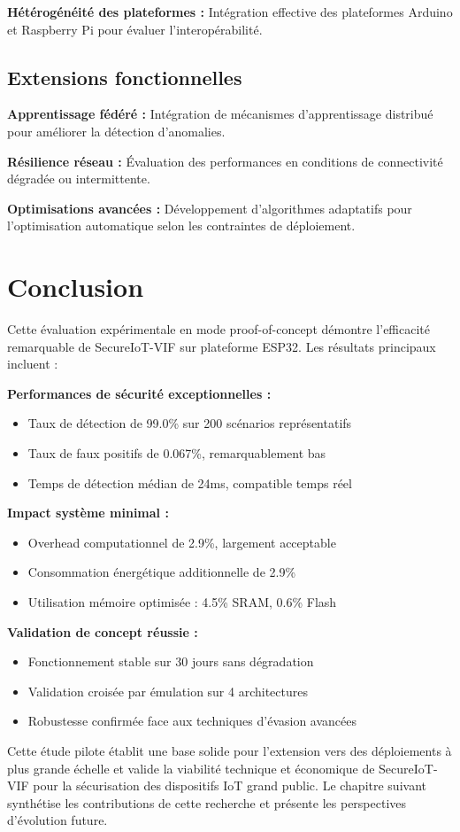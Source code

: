\textbf{Hétérogénéité des plateformes :} Intégration effective des plateformes Arduino et Raspberry Pi pour évaluer l'interopérabilité.

\subsection{Extensions fonctionnelles}

\textbf{Apprentissage fédéré :} Intégration de mécanismes d'apprentissage distribué pour améliorer la détection d'anomalies.

\textbf{Résilience réseau :} Évaluation des performances en conditions de connectivité dégradée ou intermittente.

\textbf{Optimisations avancées :} Développement d'algorithmes adaptatifs pour l'optimisation automatique selon les contraintes de déploiement.

\section{Conclusion}

Cette évaluation expérimentale en mode proof-of-concept démontre l'efficacité remarquable de SecureIoT-VIF sur plateforme ESP32. Les résultats principaux incluent :

\textbf{Performances de sécurité exceptionnelles :}
\begin{itemize}
    \item Taux de détection de 99.0\% sur 200 scénarios représentatifs
    \item Taux de faux positifs de 0.067\%, remarquablement bas
    \item Temps de détection médian de 24ms, compatible temps réel
\end{itemize}

\textbf{Impact système minimal :}
\begin{itemize}
    \item Overhead computationnel de 2.9\%, largement acceptable
    \item Consommation énergétique additionnelle de 2.9\%
    \item Utilisation mémoire optimisée : 4.5\% SRAM, 0.6\% Flash
\end{itemize}

\textbf{Validation de concept réussie :}
\begin{itemize}
    \item Fonctionnement stable sur 30 jours sans dégradation
    \item Validation croisée par émulation sur 4 architectures
    \item Robustesse confirmée face aux techniques d'évasion avancées
\end{itemize}

Cette étude pilote établit une base solide pour l'extension vers des déploiements à plus grande échelle et valide la viabilité technique et économique de SecureIoT-VIF pour la sécurisation des dispositifs IoT grand public. Le chapitre suivant synthétise les contributions de cette recherche et présente les perspectives d'évolution future.